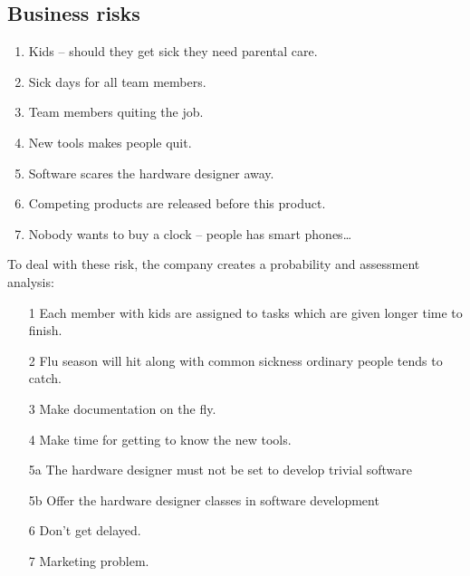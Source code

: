 \documentclass[Main]{subfiles}
\begin{document}
\subsection{Business risks} %
\label{sub:business_risks}




\begin{enumerate}
	\item Kids -- should they get sick they need parental care.
	\item Sick days for all team members.
	\item Team members quiting the job.
	\item New tools makes people quit.
	\item Software scares the hardware designer away.
	\item Competing products are released before this product.
	\item Nobody wants to buy a clock -- people has smart phones\dots
\end{enumerate}
To deal with these risk, the company creates a probability and assessment analysis:

\begin{itemize}
	\item[1] Each member with kids are assigned to tasks which are given longer time to finish.
	\item[2] Flu season will hit along with common sickness ordinary people tends to catch.
	\item[3] Make documentation on the fly.
	\item[4] Make time for getting to know the new tools.
	\item[5a] The hardware designer must not be set to develop trivial software
	\item[5b] Offer the hardware designer classes in software development
	\item[6] Don't get delayed.
	\item[7] Marketing problem.
\end{itemize}
\end{document}
